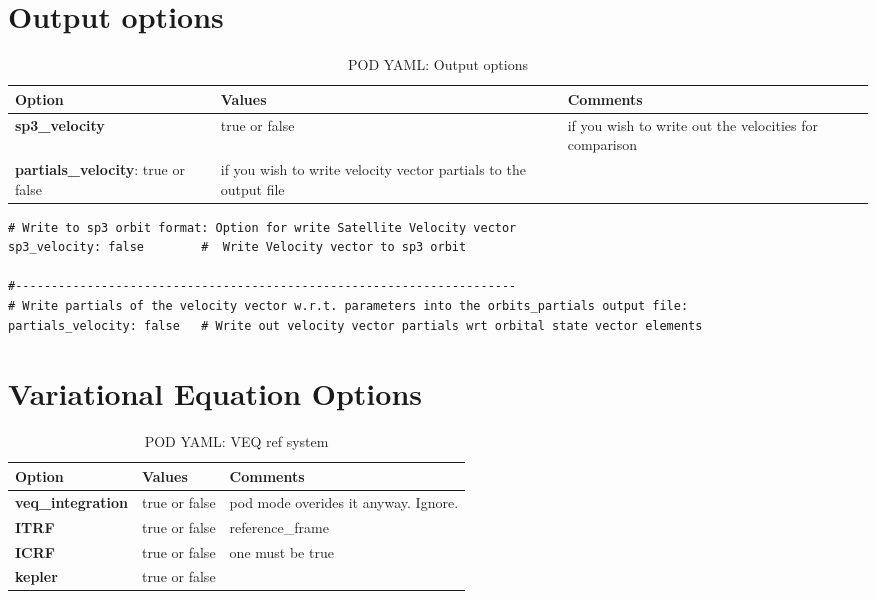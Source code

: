 \section{Output options}
\begin{table}[h!]
	\begin{tabular}{|p{4.5cm}|p{2cm}|p{3.5cm}|}
		\hline
		Option & Values & Comments \\
		\hline
        \textbf{sp3\_velocity} & true or false & if you wish to write out the velocities for comparison \\
        \textbf{partials\_velocity}: true or false & if you wish to write velocity vector partials to the output file\\
		\hline
	\end{tabular}
	\caption{POD YAML: Output options}
	\label{table:pod_yaml_output_options}
\end{table}
%
\begin{lstlisting}[language=xml,caption=yaml example for output file optionss]
# Write to sp3 orbit format: Option for write Satellite Velocity vector
sp3_velocity: false        #  Write Velocity vector to sp3 orbit

#----------------------------------------------------------------------
# Write partials of the velocity vector w.r.t. parameters into the orbits_partials output file:
partials_velocity: false   # Write out velocity vector partials wrt orbital state vector elements
\end{lstlisting}
%
\section{Variational Equation Options}
\begin{table}[h!]
	\begin{tabular}{|p{4.5cm}|p{2cm}|p{3.5cm}|}
		\hline
		Option & Values & Comments \\
		\hline
		\textbf{veq\_integration}& true or false &   pod mode overides it anyway. Ignore.\\
		\hline
		\textbf{ITRF} & true or false & reference\_frame\\
		\textbf{ICRF} & true or false &  one must be true\\   
		\textbf{kepler} & true or false & \\    
		\hline
	\end{tabular}
	\caption{POD YAML: VEQ ref system}
	\label{table:pod_yaml_veq_ref_sys}
\end{table}
%

